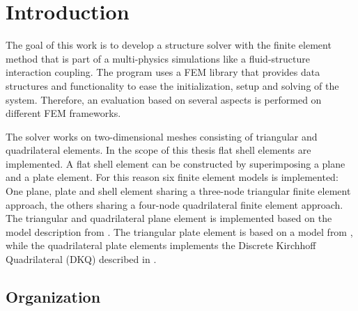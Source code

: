 \section{Introduction}

%
The goal of this work is to develop a structure solver with the finite element method that is part of a multi-physics simulations like a fluid-structure interaction coupling. The program uses a FEM library that provides data structures and functionality to ease the initialization, setup and solving of the system. Therefore, an evaluation based on several aspects is performed on different FEM frameworks.

The solver works on two-dimensional meshes consisting of triangular and quadrilateral elements. In the scope of this thesis flat shell elements are implemented. A flat shell element can be constructed by superimposing a plane and a plate element. For this reason six finite element models is implemented: One plane, plate and shell element sharing a three-node triangular finite element approach, the others sharing a four-node quadrilateral finite element approach. The triangular and quadrilateral plane element is implemented based on the model description from \cite{steinke2005finite}. The triangular plate element is based on a model from \cite{specht1988modified}, while the quadrilateral plate elements implements the Discrete Kirchhoff Quadrilateral (DKQ) described in \cite{zienkiewicz2000finite}.

\subsection{Organization}

\newline